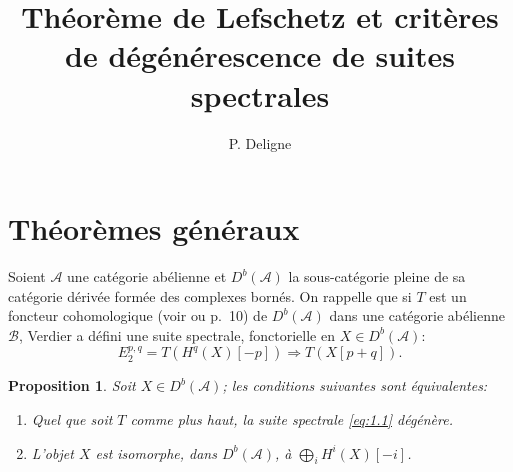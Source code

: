\documentclass[12pt]{amsart}
\title{Th\'eor\`eme de Lefschetz et crit\`eres de d\'eg\'en\'erescence de suites spectrales}
\author{P. Deligne}
\date{}
\theoremstyle{plain}
\newtheorem{prop}{Proposition}[section]
\theoremstyle{remark}
\newcommand{\cA}{\mathscr{A}}
\newcommand{\cB}{\mathscr{B}}
\newcommand{\db}{D^b}
\begin{document}
\maketitle

\section{Th\'eor\`emes g\'en\'eraux}

Soient $\cA$ une cat\'egorie ab\'elienne et $\db(\cA)$ la sous-cat\'egorie pleine de sa cat\'egorie d\'eriv\'ee form\'ee des complexes born\'es. On rappelle que si $T$ est un foncteur cohomologique (voir \cite{Verdier2} ou \cite{Verdier1} p.~10) de $\db(\cA)$ dans une cat\'egorie ab\'elienne $\cB$, Verdier \cite{Verdier2} a d\'efini une suite spectrale, fonctorielle en $X \in \db(\cA)$:
\begin{equation}\label{eq:1.1}
E_2^{p,q} = T(H^q(X)[-p]) \Rightarrow T(X[p+q]).
\end{equation}

\begin{prop}\label{prop:1.2}
Soit $X \in \db(\cA)$; les conditions suivantes sont \'equivalentes:
\begin{enumerate}
\item[(i)] Quel que soit $T$ comme plus haut, la suite spectrale \eqref{eq:1.1} d\'eg\'en\`ere.
\item[(ii)] L'objet $X$ est isomorphe, dans $\db(\cA)$, \`a $\bigoplus_i H^i(X)[-i]$.
\end{enumerate}
\end{prop}
\end{document}
